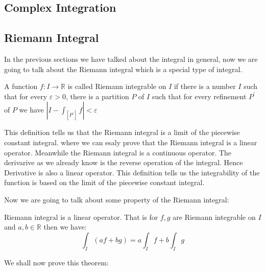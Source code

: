 \documentclass{article}
\newcommand{\R}{\mathbb{R}}
\begin{document}
\subsection{Complex Integration}























\subsection{Riemann Integral}
In the previous sections we have talked about the integral in general, now we are going to talk about the Riemann integral which is a special type of integral. 
\begin{definition}
A function $f:I\to \R$ is called Riemann integrable on $I$ if there is a number $I$ such that for every $\varepsilon >0$,
there is a partition $P$ of $I$ such that for every refinement $P^{'}$ of $P$ we have $|I-\int_{[P^{'}]}f|<\varepsilon$ 

\end{definition}

This definition tells us that the Riemann integral is a limit of the piecewise constant integral.
where we can esaly prove that the Riemann integral is a linear operator. Meanwhile the Riemann integral is a continuous operator. 
The derivarive as we already know is the reverse operation of the integral. Hence Derivative is also a linear operator. 
This definition tells us the integrability of the function is based on the limit of the piecewise constant integral. 


Now we are going to talk about some property of the Riemann integral:
\begin{theorem}
Riemann integral is a linear operator. That is for $f,g$ are Riemann integrable on $I$ and $a,b\in \R$ then we have:
$$\int_{I}(af+bg)=a\int_{I}f+b\int_{I}g$$
\end{theorem}

We shall now prove this theorem:
\end{document}
